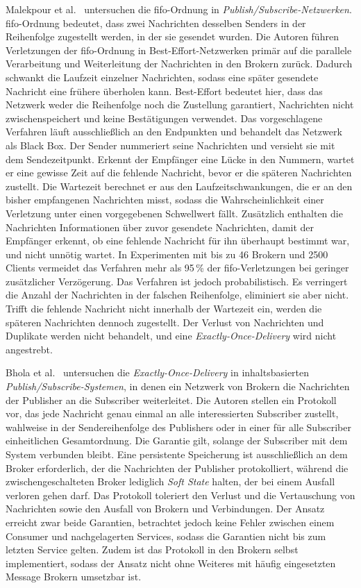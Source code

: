 Malekpour et al.~\citep{malekpour} untersuchen die \gls{fifo}-Ordnung in \textit{Publish/Subscribe-Netzwerken}. \gls{fifo}-Ordnung bedeutet, dass zwei Nachrichten desselben Senders in der Reihenfolge zugestellt werden, in der sie gesendet wurden. Die Autoren führen Verletzungen der \gls{fifo}-Ordnung in Best-Effort-Netzwerken primär auf die parallele Verarbeitung und Weiterleitung der Nachrichten in den Brokern zurück. Dadurch schwankt die Laufzeit einzelner Nachrichten, sodass eine später gesendete Nachricht eine frühere überholen kann. Best-Effort bedeutet hier, dass das Netzwerk weder die Reihenfolge noch die Zustellung garantiert, Nachrichten nicht zwischenspeichert und keine Bestätigungen verwendet. Das vorgeschlagene Verfahren läuft ausschließlich an den Endpunkten und behandelt das Netzwerk als Black Box. Der Sender nummeriert seine Nachrichten und versieht sie mit dem Sendezeitpunkt. Erkennt der Empfänger eine Lücke in den Nummern, wartet er eine gewisse Zeit auf die fehlende Nachricht, bevor er die späteren Nachrichten zustellt. Die Wartezeit berechnet er aus den Laufzeitschwankungen, die er an den bisher empfangenen Nachrichten misst, sodass die Wahrscheinlichkeit einer Verletzung unter einen vorgegebenen Schwellwert fällt. Zusätzlich enthalten die Nachrichten Informationen über zuvor gesendete Nachrichten, damit der Empfänger erkennt, ob eine fehlende Nachricht für ihn überhaupt bestimmt war, und nicht unnötig wartet. In Experimenten mit bis zu 46 Brokern und 2500 Clients vermeidet das Verfahren mehr als 95\,\% der \gls{fifo}-Verletzungen bei geringer zusätzlicher Verzögerung. Das Verfahren ist jedoch probabilistisch. Es verringert die Anzahl der Nachrichten in der falschen Reihenfolge, eliminiert sie aber nicht. Trifft die fehlende Nachricht nicht innerhalb der Wartezeit ein, werden die späteren Nachrichten dennoch zugestellt. Der Verlust von Nachrichten und Duplikate werden nicht behandelt, und eine \textit{Exactly-Once-Delivery} wird nicht angestrebt.

\newpage

Bhola et al.~\citep{bhola} untersuchen die \textit{Exactly-Once-Delivery} in inhaltsbasierten \textit{Publish/Subscribe-Systemen}, in denen ein Netzwerk von Brokern die Nachrichten der Publisher an die Subscriber weiterleitet. Die Autoren stellen ein Protokoll vor, das jede Nachricht genau einmal an alle interessierten Subscriber zustellt, wahlweise in der Sendereihenfolge des Publishers oder in einer für alle Subscriber einheitlichen Gesamtordnung. Die Garantie gilt, solange der Subscriber mit dem System verbunden bleibt. Eine persistente Speicherung ist ausschließlich an dem Broker erforderlich, der die Nachrichten der Publisher protokolliert, während die zwischengeschalteten Broker lediglich \textit{Soft State} halten, der bei einem Ausfall verloren gehen darf. Das Protokoll toleriert den Verlust und die Vertauschung von Nachrichten sowie den Ausfall von Brokern und Verbindungen. Der Ansatz erreicht zwar beide Garantien, betrachtet jedoch keine Fehler zwischen einem Consumer und nachgelagerten Services, sodass die Garantien nicht bis zum letzten Service gelten. Zudem ist das Protokoll in den Brokern selbst implementiert, sodass der Ansatz nicht ohne Weiteres mit häufig eingesetzten Message Brokern umsetzbar ist.

